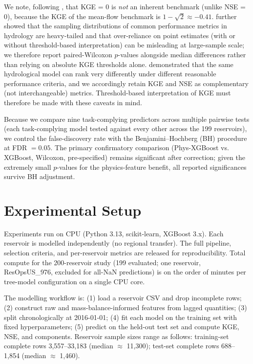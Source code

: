 \documentclass[journal]{ascelike-new}
\begin{document}
We note, following \citet{Knoben2019}, that KGE = 0 is \emph{not} an inherent benchmark (unlike NSE = 0), because the KGE of the mean-flow benchmark is $1 - \sqrt{2} \approx -0.41$. \citet{Clark2021} further showed that the sampling distributions of common performance metrics in hydrology are heavy-tailed and that over-reliance on point estimates (with or without threshold-based interpretation) can be misleading at large-sample scale; we therefore report paired-Wilcoxon $p$-values alongside median differences rather than relying on absolute KGE thresholds alone. \citet{Cinkus2023} demonstrated that the same hydrological model can rank very differently under different reasonable performance criteria, and we accordingly retain KGE and NSE as complementary (not interchangeable) metrics. Threshold-based interpretation of KGE must therefore be made with these caveats in mind.

Because we compare nine task-complying predictors across multiple pairwise tests (each task-complying model tested against every other across the 199 reservoirs), we control the false-discovery rate with the Benjamini--Hochberg (BH) procedure at FDR $=0.05$. The primary confirmatory comparison (Phys-XGBoost vs. XGBoost, Wilcoxon, pre-specified) remains significant after correction; given the extremely small $p$-values for the physics-feature benefit, all reported significances survive BH adjustment.



\section{Experimental Setup}


Experiments run on CPU (Python 3.13, scikit-learn, XGBoost 3.x). Each reservoir is modelled independently (no regional transfer). The full pipeline, selection criteria, and per-reservoir metrics are released for reproducibility. Total compute for the 200-reservoir study (199 evaluated; one reservoir, ResOpsUS\_976, excluded for all-NaN predictions) is on the order of minutes per tree-model configuration on a single CPU core.

The modelling workflow is: (1) load a reservoir CSV and drop incomplete rows; (2) construct raw and mass-balance-informed features from lagged quantities; (3) split chronologically at 2016-01-01; (4) fit each model on the training set with fixed hyperparameters; (5) predict on the held-out test set and compute KGE, NSE, and components. Reservoir sample sizes range as follows: training-set complete rows 3,557--33,183 (median $\approx$ 11,300); test-set complete rows 688--1,854 (median $\approx$ 1,460).
\end{document}
